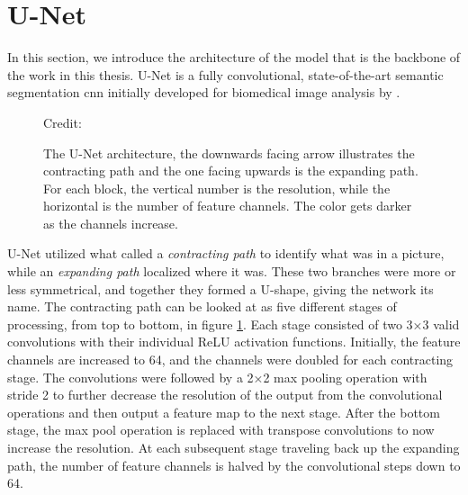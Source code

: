 \section{U-Net} \label{unet}

    In this section, we introduce the architecture of the model that is the backbone of the work in this thesis. U-Net is a fully convolutional, state-of-the-art \cite{rajak2021segmentation} semantic segmentation \gls{cnn} initially developed for biomedical image analysis by \citeauthor{unet_ronneberger2015} \cite{unet_ronneberger2015}. 
    
    \begin{figure}[H]
        \centering
        
        \caption[U-Net architecture]{The U-Net architecture, the downwards facing arrow illustrates the contracting path and the one facing upwards is the expanding path. For each block, the vertical number is the resolution, while the horizontal is the number of feature channels. The color gets darker as the channels increase.}
      	\medskip 
        \label{unet_fig}
        \hspace*{15pt}\hbox{\scriptsize Credit: \citeauthor{unet_ronneberger2015} \cite{unet_ronneberger2015}}
    \end{figure}
    
    
    U-Net utilized what \citeauthor{unet_ronneberger2015} \cite{unet_ronneberger2015} called a \textit{contracting path} to identify what was in a picture, while an \textit{expanding path} localized where it was. These two branches were more or less symmetrical, and together they formed a U-shape, giving the network its name. The contracting path can be looked at as five different stages of processing, from top to bottom, in figure \ref{unet_fig}. Each stage consisted of two 3×3 valid convolutions with their individual ReLU activation functions. Initially, the feature channels are increased to 64, and the channels were doubled for each contracting stage. The convolutions were followed by a 2×2 max pooling operation with stride 2 to further decrease the resolution of the output from the convolutional operations and then output a feature map to the next stage. After the bottom stage, the max pool operation is replaced with transpose convolutions to now increase the resolution. At each subsequent stage traveling back up the expanding path, the number of feature channels is halved by the convolutional steps down to 64. 
    
